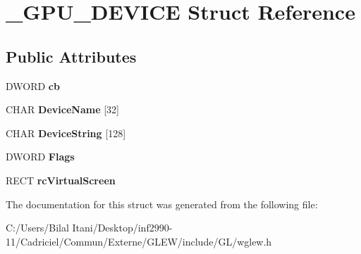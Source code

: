 \hypertarget{struct___g_p_u___d_e_v_i_c_e}{}\section{\+\_\+\+G\+P\+U\+\_\+\+D\+E\+V\+I\+CE Struct Reference}
\label{struct___g_p_u___d_e_v_i_c_e}
\subsection*{Public Attributes}
\begin{DoxyCompactItemize}
\item 
D\+W\+O\+RD {\bfseries cb}\hypertarget{struct___g_p_u___d_e_v_i_c_e_afcb22f16ba9e526610489ff56ab78ddb}{}\label{struct___g_p_u___d_e_v_i_c_e_afcb22f16ba9e526610489ff56ab78ddb}

\item 
C\+H\+AR {\bfseries Device\+Name} \mbox{[}32\mbox{]}\hypertarget{struct___g_p_u___d_e_v_i_c_e_a604bfab61f1a2c5d1e635837d369ba14}{}\label{struct___g_p_u___d_e_v_i_c_e_a604bfab61f1a2c5d1e635837d369ba14}

\item 
C\+H\+AR {\bfseries Device\+String} \mbox{[}128\mbox{]}\hypertarget{struct___g_p_u___d_e_v_i_c_e_aff8b7920ccc85afcd6f325da6cdb0b73}{}\label{struct___g_p_u___d_e_v_i_c_e_aff8b7920ccc85afcd6f325da6cdb0b73}

\item 
D\+W\+O\+RD {\bfseries Flags}\hypertarget{struct___g_p_u___d_e_v_i_c_e_a008db9d0f5fc13a5160805f40465f14a}{}\label{struct___g_p_u___d_e_v_i_c_e_a008db9d0f5fc13a5160805f40465f14a}

\item 
R\+E\+CT {\bfseries rc\+Virtual\+Screen}\hypertarget{struct___g_p_u___d_e_v_i_c_e_aeb573bbeb3b6c589246720ef259b9a27}{}\label{struct___g_p_u___d_e_v_i_c_e_aeb573bbeb3b6c589246720ef259b9a27}

\end{DoxyCompactItemize}


The documentation for this struct was generated from the following file\+:\begin{DoxyCompactItemize}
\item 
C\+:/\+Users/\+Bilal Itani/\+Desktop/inf2990-\/11/\+Cadriciel/\+Commun/\+Externe/\+G\+L\+E\+W/include/\+G\+L/wglew.\+h\end{DoxyCompactItemize}

